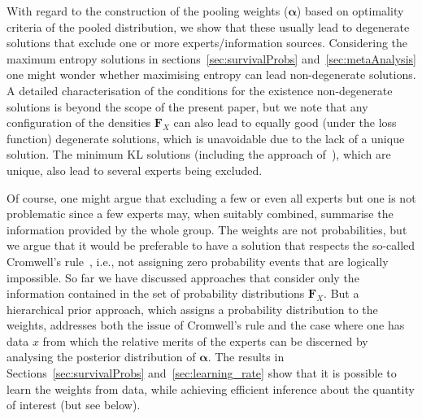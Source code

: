 \documentclass[a4paper, notitlepage, 10pt]{article}
\begin{document}
With regard to the construction of the pooling weights ($\boldsymbol\alpha$) based on optimality criteria of the pooled distribution, we show that these usually lead to degenerate solutions that exclude one or more experts/information sources.
Considering the maximum entropy solutions in sections~\ref{sec:survivalProbs} and~\ref{sec:metaAnalysis} one might wonder whether maximising entropy can lead non-degenerate solutions.
A detailed characterisation of the conditions for the existence non-degenerate solutions is beyond the scope of the present paper, but we note that any configuration of the densities $\boldsymbol F_X$ can also lead to equally good (under the loss function) degenerate solutions, which is unavoidable due to the lack of a unique solution.
The minimum KL solutions (including the approach of~\citep{rufo2012B}), which are unique, also lead to several experts being excluded.

Of course, one might argue that excluding a few or even all experts but one is not problematic since a few experts may, when suitably combined, summarise the information provided by the whole group.
The weights are not probabilities, but we argue that it would be preferable to have a solution that respects the so-called Cromwell's rule~\citep[pg. 91]{Lindley2013}, i.e., not assigning zero probability events that are logically impossible.
So far we have discussed approaches that consider only the information contained in the set of probability distributions $\boldsymbol F_X$.
But a hierarchical prior approach, which assigns a probability distribution to the weights, addresses both the issue of Cromwell's rule and the case where one has data $x$ from which the relative merits of the experts can be discerned by analysing the posterior distribution of $\boldsymbol\alpha$.
The results in Sections~\ref{sec:survivalProbs} and~\ref{sec:learning_rate} show that it is possible to learn the weights from data, while achieving efficient inference about the quantity of interest (but see below). 
\end{document}
